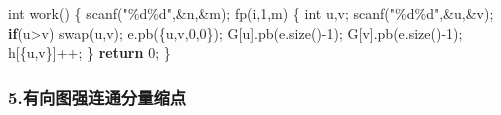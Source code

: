 \documentclass[
]{article}
\newenvironment{Shaded}{}{}
\newcommand{\ControlFlowTok}[1]{\textcolor[rgb]{0.00,0.44,0.13}{\textbf{#1}}}
\newcommand{\DataTypeTok}[1]{\textcolor[rgb]{0.56,0.13,0.00}{#1}}
\newcommand{\DecValTok}[1]{\textcolor[rgb]{0.25,0.63,0.44}{#1}}
\newcommand{\NormalTok}[1]{#1}
\newcommand{\SpecialCharTok}[1]{\textcolor[rgb]{0.25,0.44,0.63}{#1}}
\newcommand{\StringTok}[1]{\textcolor[rgb]{0.25,0.44,0.63}{#1}}
\begin{document}
\begin{Shaded}
\begin{Highlighting}[]
\DataTypeTok{int}\NormalTok{ work()}
\NormalTok{\{}
\NormalTok{    scanf(}\StringTok{"}\SpecialCharTok{\%d\%d}\StringTok{"}\NormalTok{,\&n,\&m);}
\NormalTok{    fp(i,}\DecValTok{1}\NormalTok{,m)}
\NormalTok{    \{}
        \DataTypeTok{int}\NormalTok{ u,v;}
\NormalTok{        scanf(}\StringTok{"}\SpecialCharTok{\%d\%d}\StringTok{"}\NormalTok{,\&u,\&v);}
        \ControlFlowTok{if}\NormalTok{(u\textgreater{}v) swap(u,v);}
\NormalTok{        e.pb(\{u,v,}\DecValTok{0}\NormalTok{,}\DecValTok{0}\NormalTok{\});}
\NormalTok{        G[u].pb(e.size(){-}}\DecValTok{1}\NormalTok{);}
\NormalTok{        G[v].pb(e.size(){-}}\DecValTok{1}\NormalTok{);}
\NormalTok{        h[\{u,v\}]++;}
\NormalTok{    \}}
    \ControlFlowTok{return} \DecValTok{0}\NormalTok{;}
\NormalTok{\}}
\end{Highlighting}
\end{Shaded}

\hypertarget{ux6709ux5411ux56feux5f3aux8fdeux901aux5206ux91cfux7f29ux70b9}{%
\subsubsection{5.有向图强连通分量缩点}\label{ux6709ux5411ux56feux5f3aux8fdeux901aux5206ux91cfux7f29ux70b9}}
\end{document}
